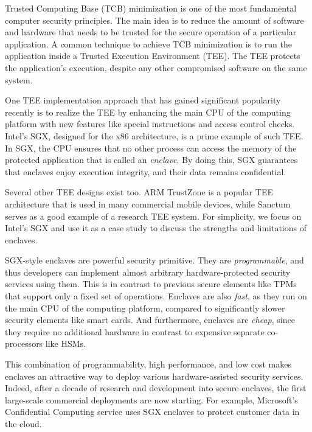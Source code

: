 
\vspace{10pt}

Trusted Computing Base (TCB) minimization is one of the most fundamental computer security principles. The main idea is to reduce the amount of software and hardware that needs to be trusted for the secure operation of a particular application. A common technique to achieve TCB minimization is to run the application inside a Trusted Execution Environment (TEE). The TEE protects the application's execution, despite any other compromised software on the same system.

One TEE implementation approach that has gained significant popularity recently is to realize the TEE by enhancing the main CPU of the computing platform with new features like special instructions and access control checks. Intel's SGX, designed for the x86 architecture, is a prime example of such TEE. In SGX, the CPU ensures that no other process can access the memory of the protected application that is called an \emph{enclave}. By doing this, SGX guarantees that enclaves enjoy execution integrity, and their data remains confidential.  

Several other TEE designs exist too. ARM TrustZone is a popular TEE architecture that is used in many commercial mobile devices, while Sanctum~\cite{sanctum} serves as a good example of a research TEE system. For simplicity, we focus on Intel's SGX and use it as a case study to discuss the strengths and limitations of enclaves.

SGX-style enclaves are powerful security primitive. They are \emph{programmable}, and thus developers can implement almost arbitrary hardware-protected security services using them. This is in contrast to previous secure elements like TPMs that support only a fixed set of operations. Enclaves are also \emph{fast}, as they run on the main CPU of the computing platform, compared to significantly slower security elements like smart cards. And furthermore, enclaves are \emph{cheap}, since they require no additional hardware in contrast to expensive separate co-processors like HSMs. 

This combination of programmability, high performance, and low cost makes enclaves an attractive way to deploy various hardware-assisted security services. Indeed, after a decade of research and development into secure enclaves, the first large-scale commercial deployments are now starting. For example, Microsoft's Confidential Computing service uses SGX enclaves to protect customer data in the cloud.

